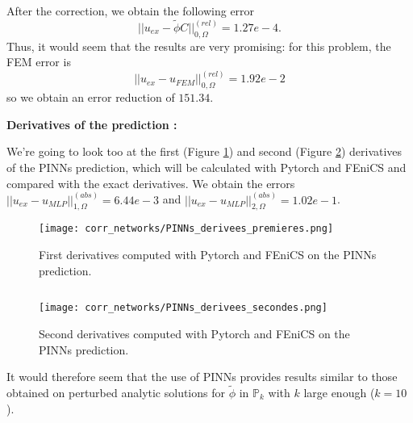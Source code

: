 After the correction, we obtain the following error 
\begin{equation*}
	||u_{ex}-\tilde{\phi}C||_{0,\Omega}^{(rel)}=1.27e-4.
\end{equation*}
Thus, it would seem that the results are very promising: for this problem, the FEM error is 
\begin{equation*}
	||u_{ex}-u_{FEM}||_{0,\Omega}^{(rel)}=1.92e-2
\end{equation*}
so we obtain an error reduction of $151.34$.

\newpage

\textbf{Derivatives of the prediction :}

We're going to look too at the first (Figure \ref{corr_networks_PINNs_derivees_premieres}) and second (Figure \ref{corr_networks_PINNs_derivees_secondes}) derivatives of the PINNs prediction, which will be calculated with Pytorch and FEniCS and compared with the exact derivatives. We obtain the errors $||u_{ex}-u_{MLP}||_{1,\Omega}^{(abs)}=6.44e-3$ and $||u_{ex}-u_{MLP}||_{2,\Omega}^{(abs)}=1.02e-1$.

\begin{minipage}{0.48\linewidth}
	\begin{figure}[H]
		\centering
		\texttt{[image: corr\_networks/PINNs\_derivees\_premieres.png]}
		\caption{First derivatives computed with Pytorch and FEniCS on the PINNs prediction.}
		\label{corr_networks_PINNs_derivees_premieres}
	\end{figure} 
\end{minipage} $\qquad$
\begin{minipage}{0.48\linewidth}
	\begin{figure}[H]
		\centering
		\texttt{[image: corr\_networks/PINNs\_derivees\_secondes.png]}
		\caption{Second derivatives computed with Pytorch and FEniCS on the PINNs prediction.}
		\label{corr_networks_PINNs_derivees_secondes}
	\end{figure} 
\end{minipage}

It would therefore seem that the use of PINNs provides results similar to those obtained on perturbed analytic solutions for $\tilde{\phi}$ in $\mathbb{P}_k$ with $k$ large enough ($k=10$).